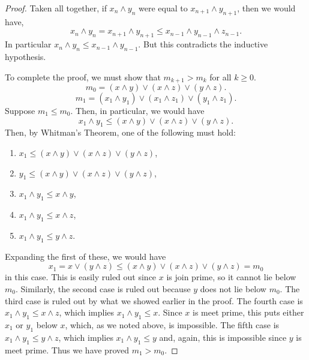 \begin{proof}
Taken all together, if 
$x_n \wedge y_n$ were equal to  $x_{n+1} \wedge y_{n+1}$,
then we would have,
\[
x_n \wedge y_n = x_{n+1} \wedge y_{n+1} \leq x_{n-1} \wedge y_{n-1} \wedge z_{n-1}.
\]
In particular $x_n \wedge y_n \leq x_{n-1} \wedge y_{n-1}$.  But this contradicts 
the inductive hypothesis. 

To complete the proof, we must show that $m_{k+1} > m_k$ for all $k\geq 0$.
\[
  m_0 = (x \wedge y) \vee (x \wedge z) \vee (y \wedge z).
  \]
\[
  m_1 = (x_1 \wedge y_1) \vee (x_1 \wedge z_1) \vee (y_1 \wedge z_1).
\]
Suppose $m_1 \leq m_0$.  Then, in particular, we would have
\[
x_1 \wedge y_1 \leq  (x \wedge y) \vee (x \wedge z) \vee (y \wedge z).
\]
Then, by Whitman's Theorem, one of the following must hold:
\begin{enumerate}
\item $x_1 \leq  (x \wedge y) \vee (x \wedge z) \vee (y \wedge z)$,
\item $y_1 \leq  (x \wedge y) \vee (x \wedge z) \vee (y \wedge z)$,
\item $x_1 \wedge y_1 \leq  x \wedge y$,
\item $x_1 \wedge y_1 \leq x \wedge z$,
\item $x_1 \wedge y_1 \leq  y \wedge z$.
\end{enumerate}
Expanding the first of these, we would have
\[
x_1 = x \vee (y \wedge z) \leq  (x \wedge y) \vee (x \wedge z) \vee (y \wedge z) = m_0
\]
in this case.  This is easily ruled out since $x$ is join prime, so it cannot lie below $m_0$.
Similarly, the second case is ruled out because $y$ does not lie below $m_0$.
The third case is ruled out by what we showed earlier in the proof.
The fourth case is $x_1 \wedge y_1 \leq x \wedge z$, 
which implies $x_1 \wedge y_1 \leq x$. Since $x$ is meet prime, this puts either $x_1$ or $y_1$ below $x$,
which, as we noted above, is impossible.
The fifth case is $x_1 \wedge y_1 \leq y \wedge z$, 
which implies $x_1 \wedge y_1 \leq y$ and, again, this is impossible since $y$ is meet prime.
Thus we have proved $m_1 > m_0$.  


\end{proof}

